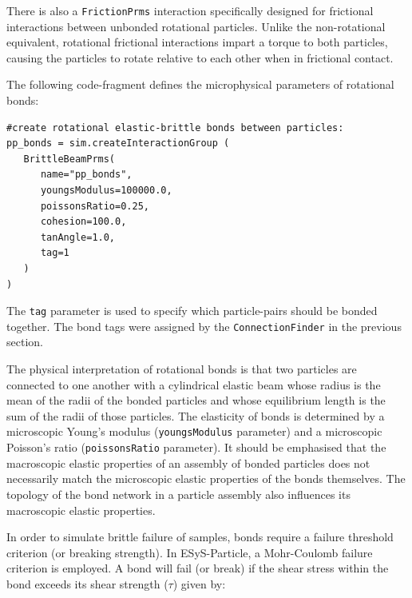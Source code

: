 There is also a \texttt{FrictionPrms} interaction specifically designed for frictional interactions between unbonded rotational particles. Unlike the non-rotational equivalent, rotational frictional interactions impart a torque to both particles, causing the particles to rotate relative to each other when in frictional contact. 

The following code-fragment defines the microphysical parameters of rotational bonds: 

\begin{verbatim}
#create rotational elastic-brittle bonds between particles:
pp_bonds = sim.createInteractionGroup (
   BrittleBeamPrms(
      name="pp_bonds",
      youngsModulus=100000.0,
      poissonsRatio=0.25,
      cohesion=100.0,
      tanAngle=1.0,
      tag=1
   )
)
\end{verbatim}

\noindent
The \texttt{tag} parameter is used to specify which particle-pairs should be bonded together. The bond tags were assigned by the \texttt{ConnectionFinder} in the previous section. 



The physical interpretation of rotational bonds is that two particles are connected to one another with a cylindrical elastic beam whose radius is the mean of the radii of the bonded particles and whose equilibrium length is the sum of the radii of those particles. The elasticity of bonds is determined by a microscopic Young's modulus (\texttt{youngsModulus} parameter) and a microscopic Poisson's ratio (\texttt{poissonsRatio} parameter). It should be emphasised that the macroscopic elastic properties of an assembly of bonded particles does not necessarily match the microscopic elastic properties of the bonds themselves. The topology of the bond network in a particle assembly also influences its macroscopic elastic properties.

In order to simulate brittle failure of samples, bonds require a failure threshold criterion (or breaking strength). In ESyS-Particle, a Mohr-Coulomb failure criterion is employed. A bond will fail (or break) if the shear stress within the bond exceeds its shear strength ($\tau$) given by:

